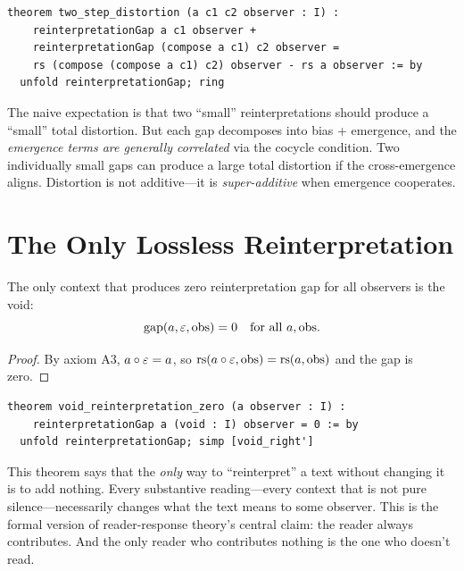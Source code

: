 \begin{lstlisting}
theorem two_step_distortion (a c1 c2 observer : I) :
    reinterpretationGap a c1 observer +
    reinterpretationGap (compose a c1) c2 observer =
    rs (compose (compose a c1) c2) observer - rs a observer := by
  unfold reinterpretationGap; ring
\end{lstlisting}

\begin{remark}
The naive expectation is that two ``small'' reinterpretations should
produce a ``small'' total distortion.  But each gap decomposes into
bias + emergence, and the \emph{emergence terms are generally correlated}
via the cocycle condition.  Two individually small gaps can produce a
large total distortion if the cross-emergence aligns.  Distortion is
not additive---it is \emph{super-additive} when emergence cooperates.
\end{remark}

\section{The Only Lossless Reinterpretation}

\begin{theorem}
\label{thm:void-preserves}
The only context that produces zero reinterpretation gap for all
observers is the void:
\[
  \mathrm{gap}(a, \varepsilon, \mathrm{obs}) = 0 \quad \text{for all } a, \mathrm{obs}.
\]
\end{theorem}

\begin{proof}
By axiom A3, $a \circ \varepsilon = a$, so
$\mathrm{rs}(a \circ \varepsilon, \mathrm{obs}) = \mathrm{rs}(a, \mathrm{obs})$
and the gap is zero.
\end{proof}

\begin{lstlisting}
theorem void_reinterpretation_zero (a observer : I) :
    reinterpretationGap a (void : I) observer = 0 := by
  unfold reinterpretationGap; simp [void_right']
\end{lstlisting}

\begin{interpretation}
This theorem says that the \emph{only} way to ``reinterpret'' a text
without changing it is to add nothing.  Every substantive reading---every
context that is not pure silence---necessarily changes what the text
means to some observer.  This is the formal version of reader-response
theory's central claim: the reader always contributes.  And the only
reader who contributes nothing is the one who doesn't read.
\end{interpretation}

